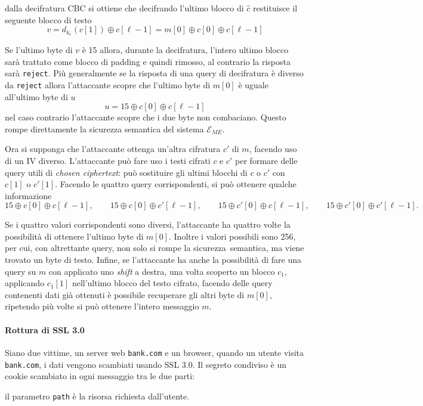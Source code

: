
dalla decifratura CBC si ottiene che decifrando l'ultimo blocco di $\hat{c}$ restituisce il seguente blocco di testo
\[
    v = d_{k_e}(c[1]) \oplus c[\ell - 1] = m[0] \oplus c[0] \oplus c[\ell -1]
\]

Se l'ultimo byte di $v$ è 15 allora, durante la decifratura, l'intero ultimo blocco sarà trattato come blocco di padding e  quindi rimosso, al contrario la risposta sarà \texttt{reject}. Più generalmente se la risposta di una query di decifratura è diverso da \texttt{reject} allora l'attaccante scopre che l'ultimo byte di $m[0]$ è uguale all'ultimo byte di $u$
\[
    u = 15 \oplus c[0] \oplus c[\ell -1]
\]
nel caso contrario l'attaccante scopre che i due byte non combaciano. Questo rompe direttamente la sicurezza semantica del sistema $\mathcal{E}_{ME}$.

Ora si supponga che l'attaccante ottenga un'altra cifratura $c'$ di $m$, facendo uso di un IV diverso. L'attaccante può fare uso i testi cifrati $c$ e $c'$ per formare delle query utili di \emph{chosen ciphertext}: può sostituire gli ultimi blocchi di $c$ o $c'$ con $c[1]$ o $c'[1]$. Facendo le quattro query corrispondenti, si può ottenere qualche informazione
\[
    15 \oplus c[0] \oplus c[\ell - 1], \qquad 15 \oplus c[0] \oplus c'[\ell - 1], \qquad 15 \oplus c'[0] \oplus c[\ell - 1], \qquad 15 \oplus c'[0] \oplus c'[\ell - 1].
\]

Se i quattro valori corrispondenti sono diversi, l'attaccante ha quattro volte la possibilità di ottenere l'ultimo byte di $m[0]$. Inoltre i valori possibili sono 256, per cui, con altrettante query, non solo si rompe la sicurezza~semantica, ma viene trovato un byte di testo. Infine, se l'attaccante ha anche la possibilità di fare una query su $m$ con applicato uno \emph{shift} a destra, una volta scoperto un blocco $c_1$, applicando $c_1[1]$ nell'ultimo blocco del testo cifrato, facendo delle query contenenti dati già ottenuti è possibile recuperare gli altri byte di $m[0]$, ripetendo più volte si può ottenere l'intero messaggio $m$.

\paragraph{Rottura di SSL 3.0}
Siano due vittime, un server web \texttt{bank.com} e un browser, quando un utente visita \texttt{bank.com}, i dati vengono scambiati usando SSL 3.0. Il segreto condiviso è un cookie scambiato in ogni messaggio tra le due parti:
\begin{center}
\end{center}
il parametro \texttt{path} è la risorsa richiesta dall'utente.


